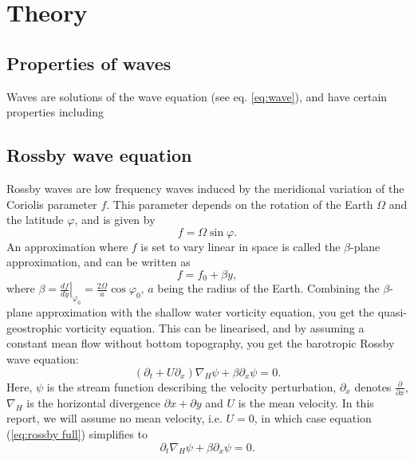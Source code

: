 \section{Theory}
\label{sec:theory}

\subsection{Properties of waves}
\label{sec:waves}
Waves are solutions of the wave equation (see eq. \ref{eq:wave}), and have certain properties including


\subsection{Rossby wave equation}
\label{sec:wave}
Rossby waves are low frequency waves induced by the meridional
variation of the Coriolis parameter $f$. This parameter depends on the rotation of the Earth $\Omega$ and the latitude $\varphi$, and is given by 
\begin{equation}
	f = \Omega \sin{\varphi}.
\end{equation} 
An approximation where $f$ is set to vary linear in space is called the $\beta$-plane approximation, and can be written as
\begin{equation}\label{beta-plane}
	f = f_0 + \beta y,
\end{equation} 
where $\beta = \left.\frac{df}{dy}\right|_{\varphi_0} = \frac{2\Omega}{a} \cos{\varphi_0}$, $a$ being the radius of the Earth. Combining the $\beta$-plane approximation with the shallow water vorticity equation, you get the quasi-geostrophic vorticity equation. This can be linearised, and by assuming a constant mean flow without bottom topography, you get the barotropic Rossby wave equation:
\begin{equation}\label{eq:rossby full}
	\left(\partial_t + U\partial_x \right) \nabla_H \psi + \beta \partial_x \psi = 0.
\end{equation}
Here, $\psi$ is the stream function describing the velocity perturbation, $\partial_x$ denotes $\frac{\partial}{\partial x}$, $\nabla_H$ is the horizontal divergence $\partial x + \partial y$ and $U$ is the mean velocity. In this report, we will assume no mean velocity, i.e. $U=0$, in which case equation (\ref{eq:rossby full}) simplifies to 
\begin{equation}\label{eq:rossby}
	\partial_t \nabla_H \psi + \beta \partial_x \psi = 0.
\end{equation}

